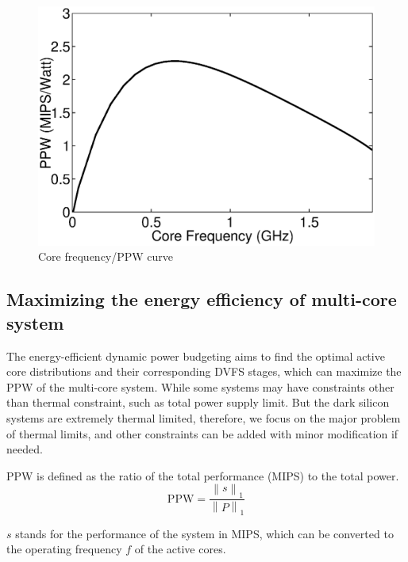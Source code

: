 \begin{figure}
\centering
\includegraphics[width=1\linewidth]{fig/f_ppw.eps}
\caption{Core frequency/PPW curve}
\label{fig:f_ppw}
\end{figure}

\subsection{Maximizing the energy efficiency of multi-core system}
The energy-efficient dynamic power budgeting aims to find the optimal active core distributions and their corresponding DVFS stages, which can maximize the PPW of the multi-core system. While some systems may have constraints other than thermal constraint, such as total power supply limit. But the dark silicon systems are extremely thermal limited, therefore, we focus on the major problem of thermal limits, and other constraints can be added with minor modification if needed.

PPW is defined as the ratio of the total performance (MIPS) to the total power.
\begin{equation}\label{eq:ppw}
\text{PPW} = \frac{\left \| s \right \|_{1}}{\left \| P \right \|_{1}}
\end{equation}

$s$ stands for the performance of the system in MIPS, which can be converted to the operating frequency $f$ of the active cores.

